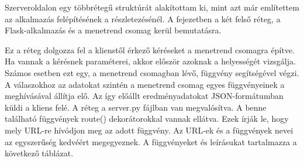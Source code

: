 
Szerveroldalon egy többrétegű struktúrát alakítottam ki, mint azt már említettem az alkalmazás felépítésének a részletezésénél. A fejezetben a két felső réteg, a Flask-alkalmazás és a menetrend csomag kerül bemutatásra.


Ez a réteg dolgozza fel a klienstől érkező kéréseket a menetrend csomagra építve. Ha vannak a kérésnek paraméterei, akkor először azoknak a helyességét vizsgálja. Számos esetben ezt egy, a menetrend csomagban lévő, függvény segítségével végzi. A válaszokhoz az adatokat szintén a menetrend csomag egyes függvényeinek a meghívásával állítja elő. Az így előállt eredményadatokat JSON-formátumban küldi a kliens felé.
A réteg a server.py fájlban van megvalósítva. A benne található függvények route() dekorátorokkal vannak ellátva. Ezek írják le, hogy mely URL-re hívódjon meg az adott függvény. Az URL-ek és a függvények nevei az egyszerűség kedvéért megegyeznek.
A függvényeket és leírásukat tartalmazza a következő táblázat.

